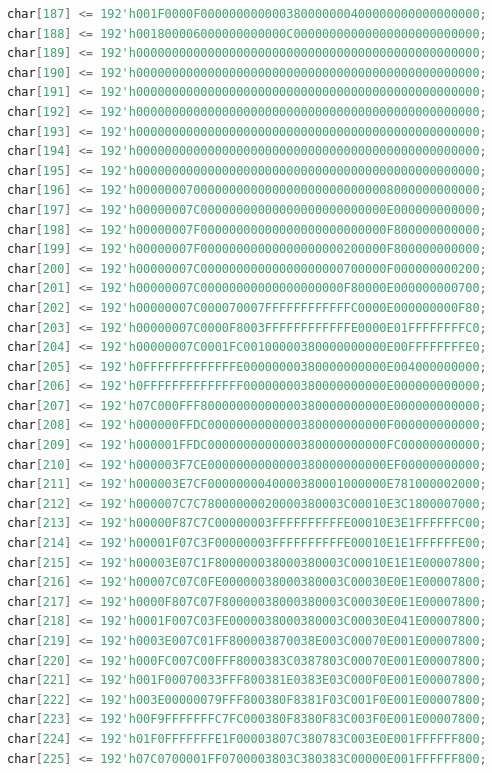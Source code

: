 \documentclass[UTF8]{article}
\theoremstyle{MyLineTheoremStyle} %
\theoremstyle{MyBlockTheoremStyle} %
\theoremstyle{MySubsubsectionStyle} %
\begin{document}
\begin{lstlisting}[language=Verilog, caption={小组成员姓名显示Verilog代码修改部分}, label={lst:verilog_code2}]
char[187] <= 192'h001F0000F000000000000380000000400000000000000000;
char[188] <= 192'h001800006000000000000C00000000000000000000000000;
char[189] <= 192'h000000000000000000000000000000000000000000000000;
char[190] <= 192'h000000000000000000000000000000000000000000000000;
char[191] <= 192'h000000000000000000000000000000000000000000000000;
char[192] <= 192'h000000000000000000000000000000000000000000000000;
char[193] <= 192'h000000000000000000000000000000000000000000000000;
char[194] <= 192'h000000000000000000000000000000000000000000000000;
char[195] <= 192'h000000000000000000000000000000000000000000000000;
char[196] <= 192'h000000070000000000000000000000000008000000000000;
char[197] <= 192'h00000007C00000000000000000000000000E000000000000;
char[198] <= 192'h00000007F00000000000000000000000000F800000000000;
char[199] <= 192'h00000007F00000000000000000000200000F800000000000;
char[200] <= 192'h00000007C00000000000000000000700000F000000000200;
char[201] <= 192'h00000007C00000000000000000000F80000E000000000700;
char[202] <= 192'h00000007C000070007FFFFFFFFFFFFC0000E000000000F80;
char[203] <= 192'h00000007C0000F8003FFFFFFFFFFFFE0000E01FFFFFFFFC0;
char[204] <= 192'h00000007C0001FC00100000380000000000E00FFFFFFFFE0;
char[205] <= 192'h0FFFFFFFFFFFFFE00000000380000000000E004000000000;
char[206] <= 192'h0FFFFFFFFFFFFFF00000000380000000000E000000000000;
char[207] <= 192'h07C000FFF80000000000000380000000000E000000000000;
char[208] <= 192'h000000FFDC0000000000000380000000000F000000000000;
char[209] <= 192'h000001FFDC0000000000000380000000000FC00000000000;
char[210] <= 192'h000003F7CE0000000000000380000000000EF00000000000;
char[211] <= 192'h000003E7CF0000000040000380001000000E781000002000;
char[212] <= 192'h000007C7C78000000020000380003C00010E3C1800007000;
char[213] <= 192'h00000F87C7C00000003FFFFFFFFFFE00010E3E1FFFFFFC00;
char[214] <= 192'h00001F07C3F00000003FFFFFFFFFFE00010E1E1FFFFFFE00;
char[215] <= 192'h00003E07C1F800000038000380003C00010E1E1E00007800;
char[216] <= 192'h00007C07C0FE00000038000380003C00030E0E1E00007800;
char[217] <= 192'h0000F807C07F80000038000380003C00030E0E1E00007800;
char[218] <= 192'h0001F007C03FE0000038000380003C00030E041E00007800;
char[219] <= 192'h0003E007C01FF800003870038E003C00070E001E00007800;
char[220] <= 192'h000FC007C00FFF8000383C0387803C00070E001E00007800;
char[221] <= 192'h001F00070033FFF800381E0383E03C000F0E001E00007800;
char[222] <= 192'h003E00000079FFF800380F8381F03C001F0E001E00007800;
char[223] <= 192'h00F9FFFFFFFC7FC000380F8380F83C003F0E001E00007800;
char[224] <= 192'h01F0FFFFFFFE1F00003807C380783C003E0E001FFFFFF800;
char[225] <= 192'h07C0700001FF0700003803C380383C00000E001FFFFFF800;

\end{lstlisting}
\end{document}
